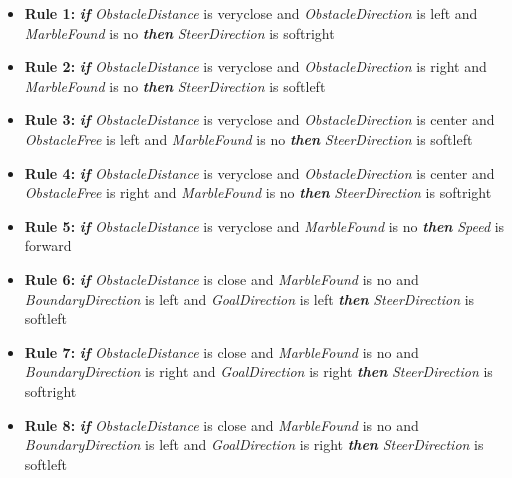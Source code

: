 \documentclass[../Head/Main.tex]{subfiles}
\begin{document}
\begin{itemize}
\item {\large \textbf{Rule 1:}} \textbf{\textit{if}} \textit{ObstacleDistance} is veryclose and \textit{ObstacleDirection} is left and \textit{MarbleFound} is no \textbf{\textit{then}} \textit{SteerDirection} is softright
 
\item {\large \textbf{Rule 2:}} \textbf{\textit{if}} \textit{ObstacleDistance} is veryclose and \textit{ObstacleDirection} is right and \textit{MarbleFound} is no \textbf{\textit{then}} \textit{SteerDirection} is softleft
 
\item {\large \textbf{Rule 3:}} \textbf{\textit{if}} \textit{ObstacleDistance} is veryclose and \textit{ObstacleDirection} is center and \textit{ObstacleFree} is left and \textit{MarbleFound} is no \textbf{\textit{then}} \textit{SteerDirection} is softleft
 
\item {\large \textbf{Rule 4:}} \textbf{\textit{if}} \textit{ObstacleDistance} is veryclose and \textit{ObstacleDirection} is center and \textit{ObstacleFree} is right and \textit{MarbleFound} is no \textbf{\textit{then}} \textit{SteerDirection} is softright
 
\item {\large \textbf{Rule 5:}} \textbf{\textit{if}} \textit{ObstacleDistance} is veryclose and \textit{MarbleFound} is no \textbf{\textit{then}} \textit{Speed} is forward

\item {\large \textbf{Rule 6:}} \textbf{\textit{if}} \textit{ObstacleDistance} is close and \textit{MarbleFound} is no and \textit{BoundaryDirection} is left and \textit{GoalDirection} is left \textbf{\textit{then}} \textit{SteerDirection} is softleft
 
\item {\large \textbf{Rule 7:}} \textbf{\textit{if}} \textit{ObstacleDistance} is close and \textit{MarbleFound} is no and \textit{BoundaryDirection} is right and \textit{GoalDirection} is right \textbf{\textit{then}} \textit{SteerDirection} is softright
 
\item {\large \textbf{Rule 8:}} \textbf{\textit{if}} \textit{ObstacleDistance} is close and \textit{MarbleFound} is no and \textit{BoundaryDirection} is left and \textit{GoalDirection} is right \textbf{\textit{then}} \textit{SteerDirection} is softleft
 

\end{itemize}
\end{document}
